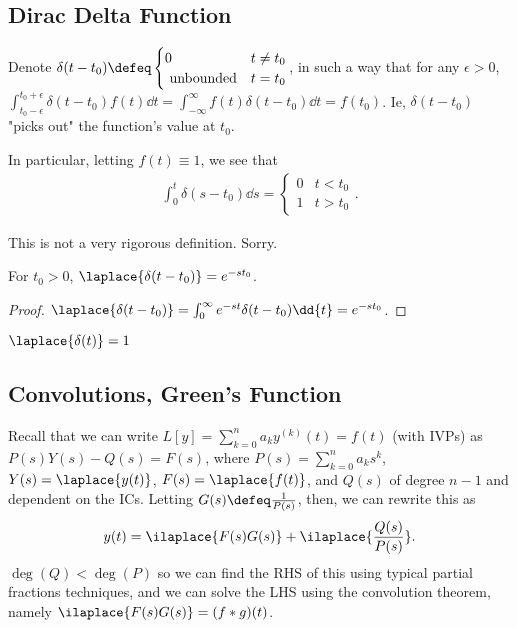 \subsection{Dirac Delta Function}

\begin{definition}
    Denote $\delta(t - t_0) \defeq \begin{cases}
        0 & t \neq t_0\\
        \text{ unbounded} & t = t_0
    \end{cases}$,
    in such a way that for any $\epsilon > 0$, $\int_{t_0-\epsilon}^{t_0 + \epsilon} \delta(t - t_0) f(t) \dd{t} = \int_{-\infty}^\infty f(t) \delta(t - t_0) \dd{t} = f(t_0)$. Ie, $\delta(t-t_0)$ "picks out" the function's value at $t_0$.

    In particular, letting $f(t) \equiv 1$, we see that \begin{align*}
        \int_0^t \delta(s - t_0) \dd{s} = \begin{cases}
            0 & t < t_0\\
            1 & t > t_0
        \end{cases}.
    \end{align*}
\end{definition}

\begin{remark}
    This is not a very rigorous definition. Sorry.
\end{remark}

\begin{theorem}
    For $t_0 > 0$, $\laplace{\delta(t - t_0)} = e^{-st_0}$.
\end{theorem}
\begin{proof}
    $\laplace{\delta(t - t_0)} = \int_0^\infty e^{-st} \delta(t - t_0) \dd{t} = e^{-s t_0}$.
\end{proof}

\begin{corollary}
    $\laplace{\delta(t)} = 1$
\end{corollary}

\subsection{Convolutions, Green's Function}

Recall that we can write $L[y] = \sum_{k=0}^n a_k y^{(k)}(t) = f(t)$ (with IVPs) as $P(s) Y(s) - Q(s) = F(s)$, where $P(s) = \sum_{k=0}^n a_k s^k$, $Y(s) = \laplace{y(t)}$, $F(s) = \laplace{f(t)}$, and $Q(s)$ of degree $n - 1$ and dependent on the ICs. Letting $G(s) \defeq \frac{1}{P(s)}$, then, we can rewrite this as \[
y(t) = \ilaplace{F(s)G(s)} + \ilaplace{\frac{Q(s)}{P(s)}}    .
\]
$\deg(Q) < \deg(P)$ so we can find the RHS of this using typical partial fractions techniques, and we can solve the LHS using the convolution theorem, namely $\ilaplace{F(s)G(s)} = (f \ast g)(t)$.

